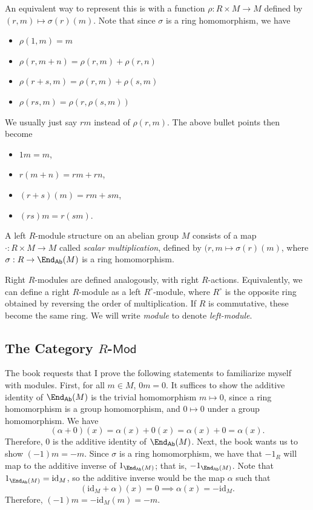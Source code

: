An equivalent way to represent this is with a function $\rho : R\times M \to M$ defined by $(r,m)\mapsto \sigma (r)(m)$. Note that since $\sigma $ is a ring homomorphism, we have
\begin{itemize}
	\item $\rho (1,m)=m$
	\item  $\rho (r,m+n)=\rho (r,m)+\rho (r,n)$
	\item  $\rho (r+s,m)=\rho (r,m)+\rho (s,m)$
	\item  $\rho (rs,m)=\rho (r,\rho (s,m))$
\end{itemize}
We usually just say $rm$ instead of $\rho (r,m)$. The above bullet points then become
\begin{itemize}
	\item $1m=m$,
	\item $r(m+n)=rm+rn$,
	\item $(r+s)(m)=rm+sm$,
	\item $(rs)m=r(sm)$.
\end{itemize}
\begin{definition}\label{dfn:3.5.1}
	A left $R$-module structure on an abelian group $M$ consists of a map $\cdot : R\times M \to M$ called \emph{scalar multiplication}, defined by $(r,m\mapsto \sigma (r)(m)$, where $\sigma : R \to \End_{\mathsf{Ab}}( M ) $ is a ring homomorphism.
\end{definition}

Right $R$-modules are defined analogously, with right $R$-actions. Equivalently, we can define a right $R$-module as a left $R^\circ $-module, where $R^\circ $ is the opposite ring obtained by reversing the order of multiplication. If $R$ is commutative, these become the same ring. We will write \emph{module} to denote \emph{left-module}.
\subsection{The Category $R$-$\mathsf{Mod}$}
The book requests that I prove the following statements to familiarize myself with modules. First, for all $m\in M$, $0m=0$. It suffices to show the additive identity of $\End_{\mathsf{Ab}}( M ) $ is the trivial homomorphism $m\mapsto 0$, since a ring homomorphism is a group homomorphism, and $0\mapsto 0$ under a group homomorphism. We have
\[
	(\alpha +0)(x)=\alpha (x)+0(x)=\alpha (x)+0=\alpha (x)
.\]
Therefore, $0$ is the additive identity of $\End_{\mathsf{Ab}}( M ) $. Next, the book wants us to show $(-1)m=-m$. Since $\sigma $ is a ring homomorphism, we have that $-1_R$ will map to the additive inverse of $1_{\End_{\mathsf{Ab}}( M ) }$; that is, $-1_{\End_{\mathsf{Ab}}( M ) }$. Note that $1_{\End_{\mathsf{Ab}}( M ) }=\mathrm{id}_{M}$, so the additive inverse would be the map  $\alpha $ such that
\[
	(\mathrm{id}_M + \alpha )(x)=0 \implies \alpha (x)=-\mathrm{id}_M
.\]
Therefore, $(-1)m=-\mathrm{id}_M(m)=-m$.

